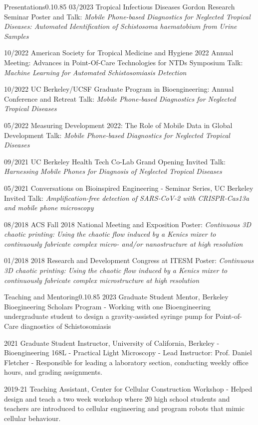 \documentclass{federico_cv}
\begin{document}
\begin{tblSection}{Presentations}{0.1}{0.85}
\leftbfrightsingle
{03/2023}
{Tropical Infectious Diseases Gordon Research Seminar}
{Poster and Talk: \textit{Mobile Phone-based Diagnostics for Neglected Tropical Diseases: Automated Identification of Schistosoma haematobium from Urine Samples}}

\leftbfrightsingle
{10/2022}
{American Society for Tropical Medicine and Hygiene 2022 Annual Meeting: Advances in Point-Of-Care Technologies for NTDs Symposium}
{Talk: \textit{Machine Learning for Automated Schistosomiasis Detection}}

\leftbfrightsingle
{10/2022}
{UC Berkeley/UCSF Graduate Program in Bioengineering: Annual Conference and Retreat}
{Talk: \textit{Mobile Phone-based Diagnostics for Neglected Tropical Diseases}}

\leftbfrightsingle
{05/2022}
{Measuring Development 2022: The Role of Mobile Data in Global Development}
{Talk: \textit{Mobile Phone-based Diagnostics for Neglected Tropical Diseases}}

\leftbfrightsingle
{09/2021}
{UC Berkeley Health Tech Co-Lab Grand Opening}
{Invited Talk: \textit{Harnessing Mobile Phones for Diagnosis of Neglected Tropical Diseases}}

\leftbfrightsingle
{05/2021}
{Conversations on Bioinspired Engineering - Seminar Series, UC Berkeley}
{Invited Talk: \textit{Amplification-free detection of SARS-CoV-2 with CRISPR-Cas13a and mobile phone microscopy}}

\leftbfrightsingle
{08/2018}
{ACS Fall 2018 National Meeting and Exposition}
{Poster: \textit{Continuous 3D chaotic printing: Using the chaotic flow induced by a Kenics mixer to continuously fabricate complex micro- and/or nanostructure at high resolution}}

\leftbfrightsingle
{01/2018}
{2018 Research and Development Congress at ITESM}
{Poster: \textit{Continuous 3D chaotic printing: Using the chaotic flow induced by a Kenics mixer to continuously fabricate complex microstructure at high resolution}}

\end{tblSection}


\begin{tblSection}{Teaching and Mentoring}{0.1}{0.85}
\leftbfrightsingle
{2023}
{Graduate Student Mentor, Berkeley Bioegineering Scholars Program}
{- Working with one Bioengineering undergraduate student to design a gravity-assisted syringe pump for Point-of-Care diagnostics of Schistosomiasis}

\leftbfrightsingle
{2021}
{Graduate Student Instructor, University of California, Berkeley}
{- Bioengineering 168L - Practical Light Microscopy}
{- Lead Instructor: Prof. Daniel Fletcher}
{- Responsible for leading a laboratory section, conducting weekly office hours, and grading assignments.}

\leftbfrightsingle
{2019-21}
{Teaching Assistant, Center for Cellular Construction Workshop}
{- Helped design and teach a two week workshop where 20 high school students and teachers are introduced to cellular engineering and program robots that mimic cellular behaviour.}

\end{tblSection}
\end{document}
